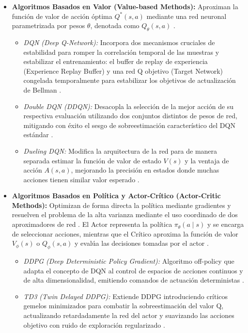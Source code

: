 \begin{itemize}
    \item \textbf{Algoritmos Basados en Valor (Value-based Methods):} Aproximan la función de valor de acción óptima $Q^*(s, a)$ mediante una red neuronal parametrizada por pesos $\theta$, denotada como $Q_\theta(s, a)$ \citep{shakya2023reinforcement}.
    \begin{itemize}
        \item \textit{DQN (Deep Q-Network):} Incorpora dos mecanismos cruciales de estabilidad para romper la correlación temporal de las muestras y estabilizar el entrenamiento: el buffer de replay de experiencia (Experience Replay Buffer) y una red Q objetivo (Target Network) congelada temporalmente para estabilizar los objetivos de actualización de Bellman \citep{hu2020deep}.
        \item \textit{Double DQN (DDQN):} Desacopla la selección de la mejor acción de su respectiva evaluación utilizando dos conjuntos distintos de pesos de red, mitigando con éxito el sesgo de sobreestimación característico del DQN estándar \citep{shakya2023reinforcement}.
        \item \textit{Dueling DQN:} Modifica la arquitectura de la red para de manera separada estimar la función de valor de estado $V(s)$ y la ventaja de acción $A(s, a)$, mejorando la precisión en estados donde muchas acciones tienen similar valor esperado \citep{shakya2023reinforcement}.
    \end{itemize}
    \item \textbf{Algoritmos Basados en Política y Actor-Crítico (Actor-Critic Methods):} Optimizan de forma directa la política mediante gradientes y resuelven el problema de la alta varianza mediante el uso coordinado de dos aproximadores de red \citep{shakya2023reinforcement}. El Actor representa la política $\pi_\theta(a \mid s)$ y se encarga de seleccionar acciones, mientras que el Crítico aproxima la función de valor $V_\phi(s)$ o $Q_\phi(s, a)$ y evalúa las decisiones tomadas por el actor \citep{sivashangaran2023deep}.
    \begin{itemize}
        \item \textit{DDPG (Deep Deterministic Policy Gradient):} Algoritmo off-policy que adapta el concepto de DQN al control de espacios de acciones continuos y de alta dimensionalidad, emitiendo comandos de actuación deterministas \citep{sivashangaran2023deep}.
        \item \textit{TD3 (Twin Delayed DDPG):} Extiende DDPG introduciendo críticos gemelos minimizados para combatir la sobreestimación del valor Q, actualizando retardadamente la red del actor y suavizando las acciones objetivo con ruido de exploración regularizado \citep{sivashangaran2023deep}.

\end{itemize}
\end{itemize}

